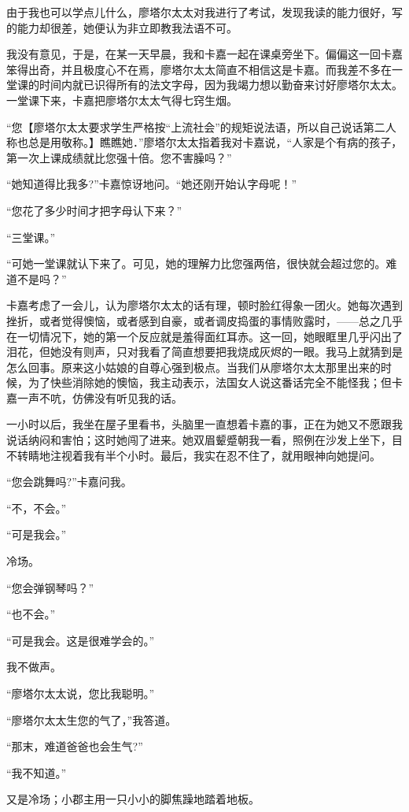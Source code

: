 \documentclass[12pt, UTF8]{ctexbook}
\begin{document}
\par 由于我也可以学点儿什么，廖塔尔太太对我进行了考试，发现我读的能力很好，写的能力却很差，她便认为非立即教我法语不可。
\par 我没有意见，于是，在某一天早晨，我和卡嘉一起在课桌旁坐下。偏偏这一回卡嘉笨得出奇，并且极度心不在焉，廖塔尔太太简直不相信这是卡嘉。而我差不多在一堂课的时间内就已识得所有的法文字母，因为我竭力想以勤奋来讨好廖塔尔太太。一堂课下来，卡嘉把廖塔尔太太气得七窍生烟。
\par “您【廖塔尔太太要求学生严格按“上流社会”的规矩说法语，所以自己说话第二人称也总是用敬称。】瞧瞧她．”廖塔尔太太指着我对卡嘉说，“人家是个有病的孩子，第一次上课成绩就比您强十倍。您不害臊吗？”
\par “她知道得比我多?”卡嘉惊讶地问。“她还刚开始认字母呢！”
\par “您花了多少时间才把字母认下来？”
\par “三堂课。”
\par “可她一堂课就认下来了。可见，她的理解力比您强两倍，很快就会超过您的。难道不是吗？”
\par 卡嘉考虑了一会儿，认为廖塔尔太太的话有理，顿时脸红得象一团火。她每次遇到挫折，或者觉得懊恼，或者感到自豪，或者调皮捣蛋的事情败露时，——总之几乎在一切情况下，她的第一个反应就是羞得面红耳赤。这一回，她眼眶里几乎闪出了泪花，但她没有则声，只对我看了简直想要把我烧成灰烬的一眼。我马上就猜到是怎么回事。原来这小姑娘的自尊心强到极点。当我们从廖塔尔太太那里出来的时候，为了快些消除她的懊恼，我主动表示，法国女人说这番话完全不能怪我；但卡嘉一声不吭，仿佛没有听见我的话。
\par 一小时以后，我坐在屋子里看书，头脑里一直想着卡嘉的事，正在为她又不愿跟我说话纳闷和害怕；这时她闯了进来。她双眉颦蹙朝我一看，照例在沙发上坐下，目不转睛地注视着我有半个小时。最后，我实在忍不住了，就用眼神向她提问。
\par “您会跳舞吗?”卡嘉问我。
\par “不，不会。”
\par “可是我会。”
\par 冷场。
\par “您会弹钢琴吗？”
\par “也不会。”
\par “可是我会。这是很难学会的。”
\par 我不做声。
\par “廖塔尔太太说，您比我聪明。”
\par “廖塔尔太太生您的气了，”我答道。
\par “那末，难道爸爸也会生气?”
\par “我不知道。”
\par 又是冷场；小郡主用一只小小的脚焦躁地踏着地板。
\end{document}
